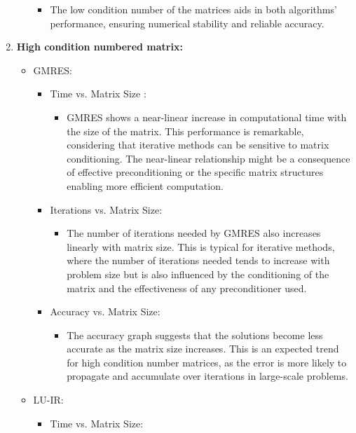 \begin{enumerate}
\begin{itemize}
\begin{itemize}
           \item The low condition number of the matrices aids in both algorithms' performance, ensuring numerical stability and reliable accuracy.
        \end{itemize}
    \end{itemize}
    \item \textbf{High condition numbered matrix:}
    \begin{itemize}
        \item GMRES:
        \begin{itemize}
            \item Time vs. Matrix Size :
            \begin{itemize}
                \item GMRES shows a near-linear increase in computational time with the size of the matrix. This performance is remarkable, considering that iterative methods can be sensitive to matrix conditioning. The near-linear relationship might be a consequence of effective preconditioning or the specific matrix structures enabling more efficient computation.
            \end{itemize}
           \item Iterations vs. Matrix Size:
           \begin{itemize}
               \item The number of iterations needed by GMRES also increases linearly with matrix size. This is typical for iterative methods, where the number of iterations needed tends to increase with problem size but is also influenced by the conditioning of the matrix and the effectiveness of any preconditioner used.
           \end{itemize}
           \item Accuracy vs. Matrix Size:
           \begin{itemize}
               \item The accuracy graph suggests that the solutions become less accurate as the matrix size increases. This is an expected trend for high condition number matrices, as the error is more likely to propagate and accumulate over iterations in large-scale problems.
           \end{itemize}
        \end{itemize}
        \item LU-IR:
        \begin{itemize}
            \item Time vs. Matrix Size:
            \begin{itemize}

\end{itemize}
\end{itemize}
\end{itemize}
\end{enumerate}
